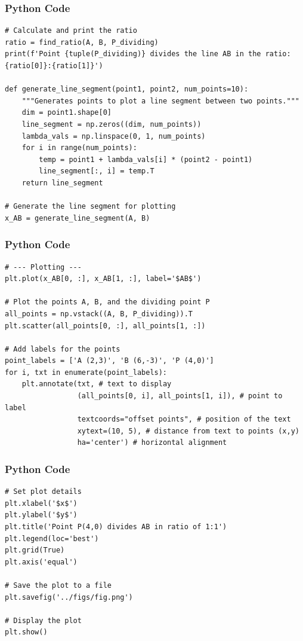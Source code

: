 \documentclass{beamer}
\begin{document}
\begin{frame}[fragile]
    \frametitle{Python Code}
    \begin{lstlisting}
# Calculate and print the ratio
ratio = find_ratio(A, B, P_dividing)
print(f'Point {tuple(P_dividing)} divides the line AB in the ratio: {ratio[0]}:{ratio[1]}')

def generate_line_segment(point1, point2, num_points=10):
    """Generates points to plot a line segment between two points."""
    dim = point1.shape[0]
    line_segment = np.zeros((dim, num_points))
    lambda_vals = np.linspace(0, 1, num_points)
    for i in range(num_points):
        temp = point1 + lambda_vals[i] * (point2 - point1)
        line_segment[:, i] = temp.T
    return line_segment

# Generate the line segment for plotting
x_AB = generate_line_segment(A, B)
    \end{lstlisting}
\end{frame}
\begin{frame}[fragile]
    \frametitle{Python Code}
    \begin{lstlisting}
# --- Plotting ---
plt.plot(x_AB[0, :], x_AB[1, :], label='$AB$')

# Plot the points A, B, and the dividing point P
all_points = np.vstack((A, B, P_dividing)).T
plt.scatter(all_points[0, :], all_points[1, :])

# Add labels for the points
point_labels = ['A (2,3)', 'B (6,-3)', 'P (4,0)']
for i, txt in enumerate(point_labels):
    plt.annotate(txt, # text to display
                 (all_points[0, i], all_points[1, i]), # point to label
                 textcoords="offset points", # position of the text
                 xytext=(10, 5), # distance from text to points (x,y)
                 ha='center') # horizontal alignment
    \end{lstlisting}
\end{frame}

\begin{frame}[fragile]
    \frametitle{Python Code}
    \begin{lstlisting}
# Set plot details
plt.xlabel('$x$')
plt.ylabel('$y$')
plt.title('Point P(4,0) divides AB in ratio of 1:1')
plt.legend(loc='best')
plt.grid(True)
plt.axis('equal')

# Save the plot to a file
plt.savefig('../figs/fig.png')

# Display the plot
plt.show()
    \end{lstlisting}
\end{frame}
\end{document}
